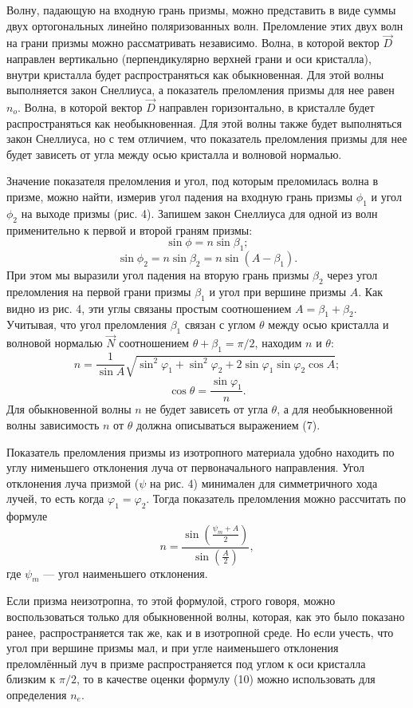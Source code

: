 \documentclass[a4paper, 12pt]{article}%
\begin{document}
Волну, падающую на входную грань призмы, можно представить в виде суммы двух ортогональных линейно поляризованных волн. Преломление этих двух волн на грани призмы можно рассматривать независимо. Волна, в которой вектор $\vec D$ направлен вертикально (перпендикулярно верхней грани и оси кристалла), внутри кристалла будет распространяться как обыкновенная. Для этой волны выполняется закон Снеллиуса, а показатель преломления призмы для нее равен $n_o$. Волна, в которой вектор $\vec D$ направлен горизонтально, в кристалле будет распространяться как необыкновенная. Для этой волны также будет выполняться закон Снеллиуса, но с тем отличием, что показатель преломления призмы для нее будет зависеть от угла между осью кристалла и волновой нормалью. 

Значение показателя преломления и угол, под которым преломилась волна в призме, можно найти, измерив угол падения на входную грань призмы $\phi_1$ и угол $\phi_2$ на выходе призмы (рис. 4). Запишем закон Снеллиуса для одной из волн применительно к первой и второй граням призмы:
\[
	\sin \phi = n \sin \beta_1;
\]
\[
	\sin \phi_2 = n \sin \beta_2 = n \sin (A - \beta_1).
\]
При этом мы выразили угол падения на вторую грань призмы $\beta_2$ через угол преломления на первой грани призмы $\beta_1$ и угол при вершине призмы $A$. Как видно из рис. 4, эти углы связаны простым соотношением $A = \beta_1 + \beta_2$. Учитывая, что угол преломления $\beta_1$ связан с углом $\theta$ между осью кристалла и волновой нормалью $\vec N$ соотношением $\theta + \beta_1 = \pi / 2$, находим $n$ и $\theta$:
\begin{equation}
n = \frac{1}{\sin A} \sqrt{\sin^2 \varphi_1 + \sin^2 \varphi_2 + 2 \sin \varphi_1 \sin \varphi_2 \cos A};
\end{equation}
\[
	\cos \theta = \frac{\sin \varphi_1}{n}.
\]
Для обыкновенной волны $n$ не будет зависеть от угла $\theta$, а для необыкновенной волны зависимость $n$ от $\theta$ должна описываться выражением (7).

Показатель преломления призмы из изотропного материала удобно находить по углу нименьшего отклонения луча от первоначального направления. Угол отклонения луча призмой ($\psi$ на рис. 4) минимален для симметричного хода лучей, то есть когда $\varphi_1 = \varphi_2$. Тогда показатель преломления можно рассчитать по формуле
\begin{equation}
n=\frac{\sin \left(\frac{\psi_{m}+A}{2}\right)}{\sin \left(\frac{A}{2}\right)},
\end{equation}
где $\psi_m$ --- угол наименьшего отклонения.

Если призма неизотропна, то этой формулой, строго говоря, можно воспользоваться только для обыкновенной волны, которая, как это было показано ранее, распространяется так же, как и в изотропной среде. Но если учесть, что угол при вершине призмы мал, и при угле наименьшего отклонения преломлённый луч в призме распространяется под углом к оси кристалла близким к $\pi / 2$, то в качестве оценки формулу (10) можно использовать для определения $n_e$.
\end{document}
